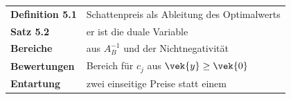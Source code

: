 \begin{merksatz}
\begin{center}
\renewcommand{\arraystretch}{1.5}
\begin{tabular}{@{}P{3.0cm}P{5.6cm}@{}}
\toprule
\textbf{Definition 5.1} & Schattenpreis als Ableitung des Optimalwerts\\
\textbf{Satz 5.2} & er ist die duale Variable\\
\textbf{Bereiche} & aus $A_B^{-1}$ und der Nichtnegativität\\
\textbf{Bewertungen} & Bereich für $c_j$ aus $\vek{y}\ge\vek{0}$\\
\textbf{Entartung} & zwei einseitige Preise statt einem\\
\bottomrule
\end{tabular}
\end{center}

\begin{center}
\begin{minipage}{0.88\textwidth}
\end{minipage}
\end{center}
\end{merksatz}
